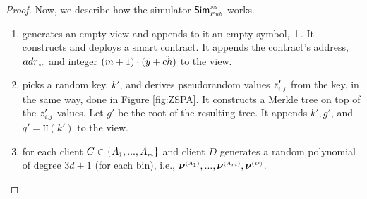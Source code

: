 \begin{proof}
 
 Now, we describe how the simulator $\mathsf{Sim}^{\scriptscriptstyle \mathtt{JUS}}_{\scriptscriptstyle Pub}$  works. 
 
 \begin{enumerate}
 \item generates an empty view and appends to it an empty symbol, $\bot$. It constructs and deploys a smart contract. It appends the contract's address, $  {adr}_{\scriptscriptstyle sc}$ and integer $(m+1)\cdot(\ddot{y}+\ddot{ch})$ to the view.
\item picks a random key, $  k'$, and derives pseudorandom values $z'_{\scriptscriptstyle i,j}$ from the key,  in the same way, done in Figure \ref{fig:ZSPA}. It constructs a Merkle tree on top of the $z'_{\scriptscriptstyle i, j}$ values. Let $g'$ be the root of the resulting tree. It appends $  k', g'$, and $q' = \mathtt{H}(  k')$ to the view. 
%
\item for each client $C\in \{  {  A}_{ \scriptscriptstyle {   1}}, ...,   {  A}_{ \scriptscriptstyle {   m}}\}$ and client $D$ generates a random polynomial of degree $3d+1$ (for each bin), i.e.,  $ {\bm\nu}^{\scriptscriptstyle (A_1)}, ...,  {\bm\nu}^{\scriptscriptstyle (A_m)},  {\bm\nu}^{\scriptscriptstyle (D)}$. 
 \end{enumerate}
 

\end{proof}
